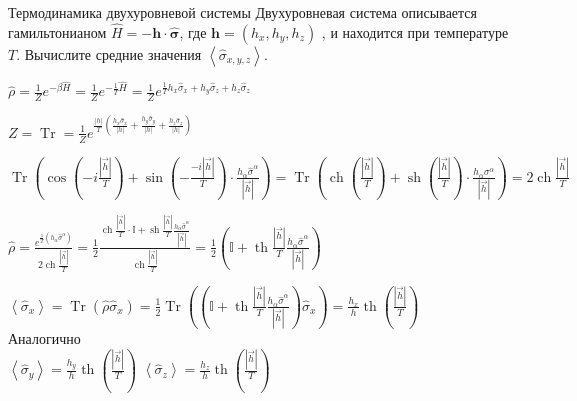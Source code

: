 \begin{problem}{Термодинамика двухуровневой системы}
	Двухуровневая система описывается гамильтонианом $
	\hat{H}=-\boldsymbol{h} \cdot \hat{\boldsymbol{\sigma}}
	$, где $
	\boldsymbol{h}=\left(h_{x}, h_{y}, h_{z}\right)
	$ , и находится при температуре $ T $. Вычислите средние значения $\left\langle\hat{\sigma}_{x, y, z}\right\rangle$.
\end{problem}	

\begin{solution}
	$\displaystyle 
	\hat{\rho}=\frac{1}{Z} e^{-\beta \hat{H}} = \frac{1}{Z} e^{-\frac{1}{T} \hat{H}} = \frac{1}{Z} e^{\frac{1}{T} h_x \hat{\sigma}_{x}+h_y \hat{\sigma}_{z}+h_z \hat{\sigma}_{z}}$
	
	
	$ \displaystyle 
	Z = \operatorname{Tr}	= \frac{1}{Z} e^{\frac{|h|}{T} \left(\frac{h_x \hat{\sigma}_{x}}{|h|}+\frac{h_y \hat{\sigma}_{y}}{|h|}+\frac{h_z \hat{\sigma}_{z}}{|h|}\right)} 
	$
	
	$ \displaystyle 
	\operatorname{Tr}\left(\cos \left(-i \frac{|\vec{h}|}{T}\right)+\sin \left(-\frac{-i |\vec{h}|}{T}\right) \cdot \frac{h_\alpha \hat{\sigma}^{\alpha}}{|\vec{h}|}\right)=
	\operatorname{Tr}\left(\operatorname{ch } \left(\frac{|\vec{h}|}{T}\right)+\operatorname{sh}\left(\frac{|\vec{h}|}{T}\right) \cdot \frac{h_{\alpha} \sigma^{\alpha}}{|\vec{h}|}\right) = 2 \operatorname{ch} \frac{|\vec{h}|}{T}
	$
	
	$ \displaystyle
	\hat{\rho}=\frac{e^{\frac{1}{T}\left(h_{\alpha} \hat{\sigma}^{\alpha}\right)}}{2 \operatorname{ch} \frac{|\vec{h}|}{T}} = \frac{1}{2}\frac{\operatorname{ch}\frac{|\vec{h}|}{T} \cdot \mathbb{I} + \operatorname{sh}\frac{|\vec{h}|}{T} \frac{h_{\alpha} \hat{\sigma}^{\alpha}}{|\vec{h}|}}{\operatorname{ch}\frac{|\vec{h}|}{T}} = \frac{1}{2}\left(\mathbb{I} + \operatorname{th}\frac{|\vec{h}|}{T}\frac{h_{\alpha} \hat{\sigma}^{\alpha}}{|\vec{h}|}\right)
	$
	
	
	$
	\left\langle \hat{\sigma}_{x}\right\rangle =\operatorname{Tr}\left(\hat{\rho} \hat{\sigma}_{x}\right)= \frac{1}{2} \operatorname{Tr}\left(\left(\mathbb{I}+\operatorname{th} \frac{|\vec{h}|}{T} \frac{h_{\alpha} \hat{\sigma}^{\alpha}}{|\vec{h}|}\right) \hat{\sigma}_{x}\right) = \frac{h_x}{h} \operatorname{th}\left(\frac{|\vec{h}|}{T}\right)
	$
	\\
	Аналогично
	\\
	
	$ 	\left\langle \hat{\sigma}_{y}\right\rangle = \frac{h_y}{h} \operatorname{th}\left(\frac{|\vec{h}|}{T}\right) $
	$ 	\left\langle \hat{\sigma}_{z}\right\rangle = \frac{h_z}{h} \operatorname{th}\left(\frac{|\vec{h}|}{T}\right) $
	
\end{solution}	



